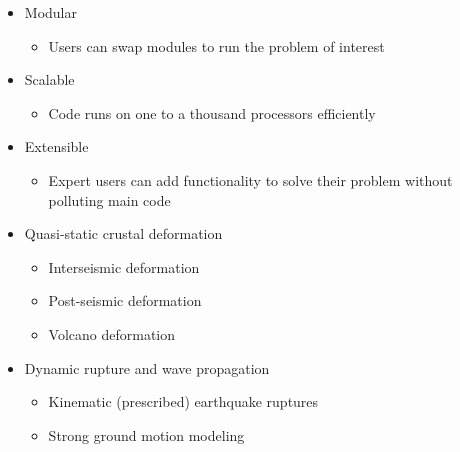 \documentclass[pdftex,cig,slideColor]{pp4slides}
\begin{document}
  
  \begin{itemize}
  \item Modular
    \begin{itemize}
    \item Users can swap modules to run the problem of interest
    \end{itemize}
  \item Scalable
    \begin{itemize}
    \item Code runs on one to a thousand processors efficiently
    \end{itemize}    
  \item Extensible
    \begin{itemize}
    \item Expert users can add functionality to solve their problem
      without polluting main code
    \end{itemize}
  \end{itemize}


  \begin{itemize}
  \item Quasi-static crustal deformation
    \begin{itemize}
    \item Interseismic deformation
    \item Post-seismic deformation
    \item Volcano deformation
    \end{itemize}
  \item Dynamic rupture and wave propagation
    \begin{itemize}
    \item Kinematic (prescribed) earthquake ruptures
    \item Strong ground motion modeling
    \end{itemize}
  \end{itemize}

\end{document}
